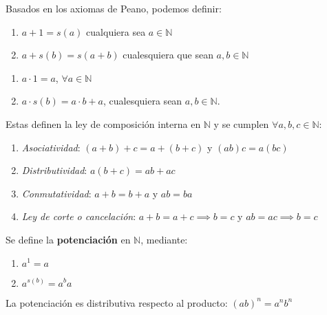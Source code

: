 Basados en los axiomas de Peano, podemos definir:

\begin{fmd-definition}[Adición en $\N$]
	\begin{enumerate}[label=\alph*)]
		\item $a + 1 = s(a)$ cualquiera sea $a \in \mathbb{N}$
		\item $a + s(b) = s(a + b)$ cualesquiera que sean $a, b \in \mathbb{N}$
	\end{enumerate}
\end{fmd-definition}

\begin{fmd-definition}[Multiplicación en $\N$]
	\begin{enumerate}[label=\alph*)]
		\item $a \cdot 1 = a$, $\forall a \in \mathbb{N}$
		\item $a \cdot s(b) = a \cdot b + a$, cualesquiera sean $a, b \in \mathbb{N}$.
	\end{enumerate}
\end{fmd-definition}

Estas definen la ley de composición interna en $\mathbb{N}$ y se cumplen $\forall a, b, c \in \mathbb{N}$:
\begin{enumerate}
	\item \textit{Asociatividad}: $(a+b)+c = a + (b+c)$ y $(ab)c = a(bc)$
	\item \textit{Distributividad}: $a(b+c) = ab + ac$
	\item \textit{Conmutatividad}: $a + b = b + a$ y $ab = ba$
	\item \textit{Ley de corte o cancelación}: $a+b = a + c \implies b=c$ y $ab=ac \implies b=c$
\end{enumerate}

Se define la \textbf{potenciación} en $\mathbb{N}$, mediante:

\begin{fmd-definition}[Potenciación en $\N$]
	\begin{enumerate}[label=\alph*)]
		\item $a^1 = a$
		\item $a^{s(b)} = a^ba$
	\end{enumerate}
\end{fmd-definition}


\begin{fmd-proposition}
	La potenciación es distributiva respecto al producto: $(ab)^n = a^n b^n$
\end{fmd-proposition}

